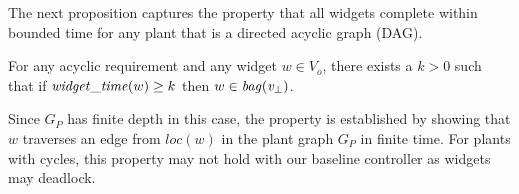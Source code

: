 The next proposition  captures the  property that all widgets complete within bounded time for any plant that is a directed acyclic graph (DAG). 
\begin{proposition}
	\label{prop:timebound}
For any acyclic requirement and any widget $w\in V_o$, there exists a $k>0$ such that if $\mathit{widget\_time}(w) \geq k$ then $w \in \mathit{bag}(\mathit{v}_\bot)$.
\end{proposition}
Since $G_P$ has finite depth in this case, the property is established by  showing that $w$ traverses an edge from $loc(w)$ in the plant graph $G_P$ in finite time. 
%
For plants with cycles, this property may not hold with our baseline controller as widgets may deadlock.

%    
    


%    
%    
%    
%   

